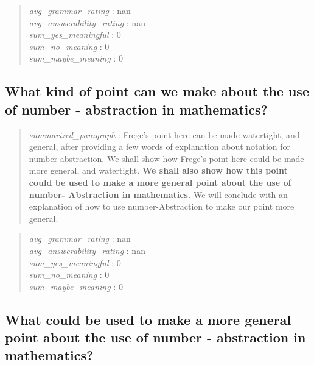 \begin{quote}
\emph{avg\_grammar\_rating} : nan\\
\emph{avg\_answerability\_rating} : nan\\
\emph{sum\_yes\_meaningful} : 0\\
\emph{sum\_no\_meaning} : 0\\
\emph{sum\_maybe\_meaning} : 0
\end{quote}

\hypertarget{what-kind-of-point-can-we-make-about-the-use-of-number---abstraction-in-mathematics}{%
\subsection{What kind of point can we make about the use of number -
abstraction in
mathematics?}\label{what-kind-of-point-can-we-make-about-the-use-of-number---abstraction-in-mathematics}}

\begin{quote}
\emph{summarized\_paragraph} : Frege's point here can be made
watertight, and general, after providing a few words of explanation
about notation for number-abstraction. We shall show how Frege's point
here could be made more general, and watertight. \textbf{We shall also
show how this point could be used to make a more general point about the
use of number- Abstraction in mathematics.} We will conclude with an
explanation of how to use number-Abstraction to make our point more
general.
\end{quote}

\begin{quote}
\emph{avg\_grammar\_rating} : nan\\
\emph{avg\_answerability\_rating} : nan\\
\emph{sum\_yes\_meaningful} : 0\\
\emph{sum\_no\_meaning} : 0\\
\emph{sum\_maybe\_meaning} : 0
\end{quote}

\hypertarget{what-could-be-used-to-make-a-more-general-point-about-the-use-of-number---abstraction-in-mathematics}{%
\subsection{What could be used to make a more general point about the
use of number - abstraction in
mathematics?}\label{what-could-be-used-to-make-a-more-general-point-about-the-use-of-number---abstraction-in-mathematics}}

